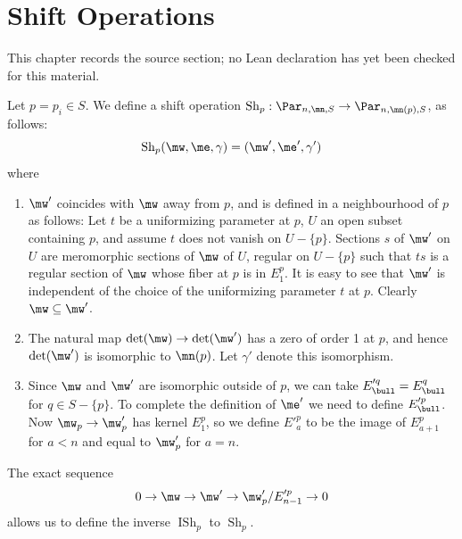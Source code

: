 \chapter{Shift Operations}
\label{rigid-local-systems-multiplicative-eigenvalue-problem-chapter-04}

\begin{remark}
\label{rigid-local-systems-multiplicative-eigenvalue-problem-chapter-04-source}
This chapter records the source section; no Lean declaration has yet been checked for this material.
\notready
\end{remark}

\label{shifty}
Let $p=p_i\in S$. We define a shift operation $\operatorname{Sh}_p: \Par_{n,\mn,S}\to \Par_{n,\mn(p),S}$,  as follows:
$$\operatorname{Sh}_p(\mw,\me,\gamma)=(\mw',\me',\gamma')$$
where
\begin{enumerate}
\item $\mw'$ coincides with $\mw$ away from $p$, and is defined in a neighbourhood of $p$ as follows: Let $t$ be a uniformizing parameter at $p$, $U$ an open subset containing $p$, and assume $t$ does not vanish on $U-\{p\}$. Sections $s$ of $\mw'$ on $U$ are meromorphic sections of $\mw$ of $U$, regular on $U-\{p\}$ such that $ts$ is a regular section of $\mw$
whose fiber at $p$ is in $E^p_1$. It is easy to see that $\mw'$ is independent of the choice of the uniformizing parameter $t$ at $p$. Clearly $\mw\subseteq\mw'$.
\item
The natural map $\det(\mw)\to \det(\mw')$ has a zero of order 1 at $p$, and hence $\det(\mw')$ is isomorphic to $\mn(p)$. Let $\gamma'$ denote this isomorphism.
\item Since $\mw$ and $\mw'$ are isomorphic outside of $p$, we can take $E'^{q}_{\bull}=E^q_{\bull}$ for $q\in S-\{p\}$. To complete the definition of $\me'$ we need to define $E'^p_{\bull}$.  Now $\mw_p\to \mw'_p$ has kernel $E^p_1$, so we define $E'^p_a$ to be the image of $E^p_{a+1}$ for $a<n$ and equal to  $\mw'_p$ for $a=n$.
\end{enumerate}

The exact sequence
$$0\to \mw \to \mw'\to \mw'_p/E'^p_{n-1}\to 0$$
allows us to define the inverse $\operatorname{ISh}_p$ to $\operatorname{Sh}_p$.
